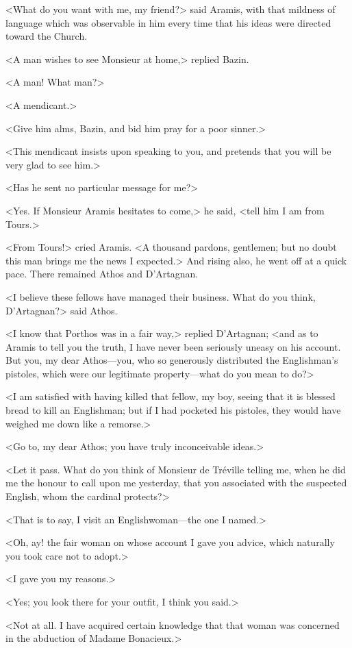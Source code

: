 <What do you want with me, my friend?> said Aramis, with that mildness of language which was observable in him every time that his ideas were directed toward the Church. 

<A man wishes to see Monsieur at home,> replied Bazin. 

<A man! What man?> 

<A mendicant.> 

<Give him alms, Bazin, and bid him pray for a poor sinner.> 

<This mendicant insists upon speaking to you, and pretends that you will be very glad to see him.> 

<Has he sent no particular message for me?> 

<Yes. If Monsieur Aramis hesitates to come,> he said, <tell him I am from Tours.> 

<From Tours!> cried Aramis. <A thousand pardons, gentlemen; but no doubt this man brings me the news I expected.> And rising also, he went off at a quick pace. There remained Athos and D'Artagnan. 

<I believe these fellows have managed their business. What do you think, D'Artagnan?> said Athos. 

<I know that Porthos was in a fair way,> replied D'Artagnan; <and as to Aramis to tell you the truth, I have never been seriously uneasy on his account. But you, my dear Athos—you, who so generously distributed the Englishman's pistoles, which were our legitimate property—what do you mean to do?> 

<I am satisfied with having killed that fellow, my boy, seeing that it is blessed bread to kill an Englishman; but if I had pocketed his pistoles, they would have weighed me down like a remorse.> 

<Go to, my dear Athos; you have truly inconceivable ideas.> 

<Let it pass. What do you think of Monsieur de Tréville telling me, when he did me the honour to call upon me yesterday, that you associated with the suspected English, whom the cardinal protects?> 

<That is to say, I visit an Englishwoman—the one I named.> 

<Oh, ay! the fair woman on whose account I gave you advice, which naturally you took care not to adopt.> 

<I gave you my reasons.> 

<Yes; you look there for your outfit, I think you said.> 

<Not at all. I have acquired certain knowledge that that woman was concerned in the abduction of Madame Bonacieux.> 

